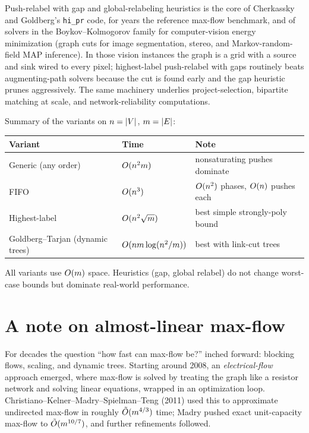 \begin{applicationbox}
Push-relabel with gap and global-relabeling heuristics is the core of Cherkassky and Goldberg's \texttt{hi\_pr} code, for years the reference max-flow benchmark, and of solvers in the Boykov--Kolmogorov family for computer-vision energy minimization (graph cuts for image segmentation, stereo, and Markov-random-field MAP inference). In those vision instances the graph is a grid with a source and sink wired to every pixel; highest-label push-relabel with gaps routinely beats augmenting-path solvers because the cut is found early and the gap heuristic prunes aggressively. The same machinery underlies project-selection, bipartite matching at scale, and network-reliability computations.
\end{applicationbox}

\begin{complexitybox}
Summary of the variants on $n=\lvert V\rvert$, $m=\lvert E\rvert$:
\begin{center}\small
\begin{tabular}{lll}
\toprule
Variant & Time & Note\\
\midrule
Generic (any order) & $O(n^2 m)$ & nonsaturating pushes dominate\\
FIFO & $O(n^3)$ & $O(n^2)$ phases, $O(n)$ pushes each\\
Highest-label & $O(n^2\sqrt m)$ & best simple strongly-poly bound\\
Goldberg--Tarjan (dynamic trees) & $O(nm\log(n^2/m))$ & best with link-cut trees\\
\bottomrule
\end{tabular}
\end{center}
All variants use $O(m)$ space. Heuristics (gap, global relabel) do not change worst-case bounds but dominate real-world performance.
\end{complexitybox}

\section{A note on almost-linear max-flow}
\label{ch13:modern}

For decades the question ``how fast can max-flow be?'' inched forward: blocking flows, scaling, and dynamic trees. Starting around 2008, an \emph{electrical-flow} approach emerged, where max-flow is solved by treating the graph like a resistor network and solving linear equations, wrapped in an optimization loop. Christiano--Kelner--Madry--Spielman--Teng (2011) used this to approximate undirected max-flow in roughly $\tilde{O}(m^{4/3})$ time; Madry pushed exact unit-capacity max-flow to $\tilde{O}(m^{10/7})$, and further refinements followed.

